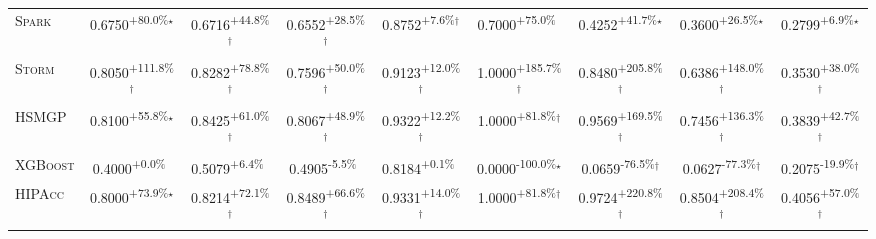 \begin{table}[htbp]
\begin{tabular}{l|cccc|cccc}
\textsc{Spark} & \cellcolor{green!30}0.6750\textsuperscript{+80.0\%}$^\star$ & \cellcolor{green!30}0.6716\textsuperscript{+44.8\%}$^\dagger$ & \cellcolor{green!30}0.6552\textsuperscript{+28.5\%}$^\dagger$ & \cellcolor{green!30}0.8752\textsuperscript{+7.6\%}$^\dagger$ & \cellcolor{green!30}0.7000\textsuperscript{+75.0\%}$^{\,\,\,}$ & \cellcolor{green!30}0.4252\textsuperscript{+41.7\%}$^\star$ & \cellcolor{green!30}0.3600\textsuperscript{+26.5\%}$^\star$ & \cellcolor{green!30}0.2799\textsuperscript{+6.9\%}$^\star$ \\
\textsc{Storm} & \cellcolor{green!30}0.8050\textsuperscript{+111.8\%}$^\dagger$ & \cellcolor{green!30}0.8282\textsuperscript{+78.8\%}$^\dagger$ & \cellcolor{green!30}0.7596\textsuperscript{+50.0\%}$^\dagger$ & \cellcolor{green!30}0.9123\textsuperscript{+12.0\%}$^\dagger$ & \cellcolor{green!30}1.0000\textsuperscript{+185.7\%}$^\dagger$ & \cellcolor{green!30}0.8480\textsuperscript{+205.8\%}$^\dagger$ & \cellcolor{green!30}0.6386\textsuperscript{+148.0\%}$^\dagger$ & \cellcolor{green!30}0.3530\textsuperscript{+38.0\%}$^\dagger$ \\
\textsc{HSMGP} & \cellcolor{green!30}0.8100\textsuperscript{+55.8\%}$^\star$ & \cellcolor{green!30}0.8425\textsuperscript{+61.0\%}$^\dagger$ & \cellcolor{green!30}0.8067\textsuperscript{+48.9\%}$^\dagger$ & \cellcolor{green!30}0.9322\textsuperscript{+12.2\%}$^\dagger$ & \cellcolor{green!30}1.0000\textsuperscript{+81.8\%}$^\dagger$ & \cellcolor{green!30}0.9569\textsuperscript{+169.5\%}$^\dagger$ & \cellcolor{green!30}0.7456\textsuperscript{+136.3\%}$^\dagger$ & \cellcolor{green!30}0.3839\textsuperscript{+42.7\%}$^\dagger$ \\
\textsc{XGBoost} & \cellcolor{green!30}0.4000\textsuperscript{+0.0\%}$^{\,\,\,}$ & \cellcolor{green!30}0.5079\textsuperscript{+6.4\%}$^{\,\,\,}$ & \cellcolor{red!30}0.4905\textsuperscript{-5.5\%}$^{\,\,\,}$ & \cellcolor{green!30}0.8184\textsuperscript{+0.1\%}$^{\,\,\,}$ & \cellcolor{red!30}0.0000\textsuperscript{-100.0\%}$^\star$ & \cellcolor{red!30}0.0659\textsuperscript{-76.5\%}$^\dagger$ & \cellcolor{red!30}0.0627\textsuperscript{-77.3\%}$^\dagger$ & \cellcolor{red!30}0.2075\textsuperscript{-19.9\%}$^\dagger$ \\
\textsc{HIPAcc} & \cellcolor{green!30}0.8000\textsuperscript{+73.9\%}$^\star$ & \cellcolor{green!30}0.8214\textsuperscript{+72.1\%}$^\dagger$ & \cellcolor{green!30}0.8489\textsuperscript{+66.6\%}$^\dagger$ & \cellcolor{green!30}0.9331\textsuperscript{+14.0\%}$^\dagger$ & \cellcolor{green!30}1.0000\textsuperscript{+81.8\%}$^\dagger$ & \cellcolor{green!30}0.9724\textsuperscript{+220.8\%}$^\dagger$ & \cellcolor{green!30}0.8504\textsuperscript{+208.4\%}$^\dagger$ & \cellcolor{green!30}0.4056\textsuperscript{+57.0\%}$^\dagger$ \\

\end{tabular}
\end{table}
